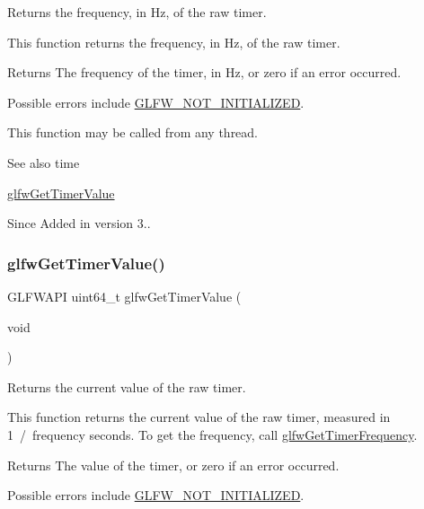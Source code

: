 Returns the frequency, in Hz, of the raw timer. 

This function returns the frequency, in Hz, of the raw timer.

\begin{DoxyReturn}{Returns}
The frequency of the timer, in Hz, or zero if an error occurred.
\end{DoxyReturn}
Possible errors include \hyperlink{group__errors_ga2374ee02c177f12e1fa76ff3ed15e14a}{G\+L\+F\+W\+\_\+\+N\+O\+T\+\_\+\+I\+N\+I\+T\+I\+A\+L\+I\+Z\+ED}.

This function may be called from any thread.

\begin{DoxySeeAlso}{See also}
time 

\hyperlink{group__input_gaa00c3e32227eb70b3968fca0bfe4ae26}{glfw\+Get\+Timer\+Value}
\end{DoxySeeAlso}
\begin{DoxySince}{Since}
Added in version 3.. 
\end{DoxySince}
\mbox{\label{group__input_gaa00c3e32227eb70b3968fca0bfe4ae26}} 
\subsubsection{\texorpdfstring{glfw\+Get\+Timer\+Value()}{glfwGetTimerValue()}}
{\footnotesize\ttfamily G\+L\+F\+W\+A\+PI uint64\+\_\+t glfw\+Get\+Timer\+Value (\begin{DoxyParamCaption}\item[{void}]{ }\end{DoxyParamCaption})}



Returns the current value of the raw timer. 

This function returns the current value of the raw timer, measured in 1~/~frequency seconds. To get the frequency, call \hyperlink{group__input_gaa92d10b10013372778efbf6367714371}{glfw\+Get\+Timer\+Frequency}.

\begin{DoxyReturn}{Returns}
The value of the timer, or zero if an error occurred.
\end{DoxyReturn}
Possible errors include \hyperlink{group__errors_ga2374ee02c177f12e1fa76ff3ed15e14a}{G\+L\+F\+W\+\_\+\+N\+O\+T\+\_\+\+I\+N\+I\+T\+I\+A\+L\+I\+Z\+ED}.

